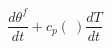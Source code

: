 \begin{equation}
[(h^f-h^g) + (T- T_{ref}) (c_p^f-c_p^g) ]\frac{d\theta^f }{dt} + c_p(\ ) \frac{d T}{dt} 
\end{equation}